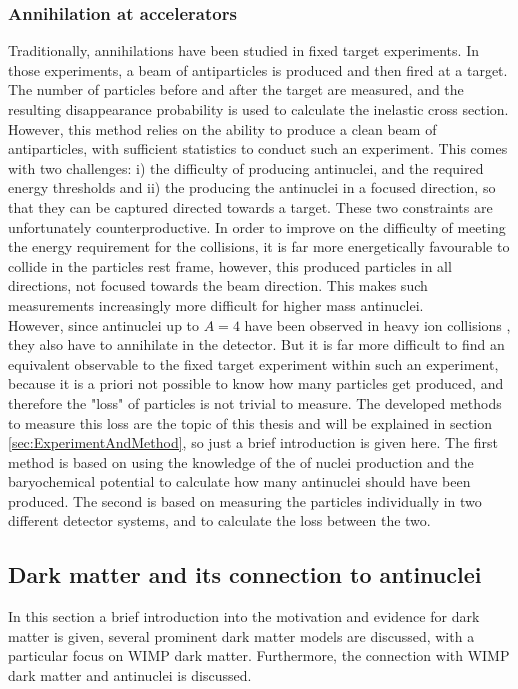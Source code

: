\subsubsection{Annihilation at accelerators}
Traditionally, annihilations have been studied in fixed target experiments. In those experiments, a beam of antiparticles is produced and then fired at a target. The number of particles before and after the target are measured, and the resulting disappearance probability is used to calculate the inelastic cross section. However, this method relies on the ability to produce a clean beam of antiparticles, with sufficient statistics to conduct such an experiment. This comes with two challenges: i) the difficulty of producing antinuclei, and the required energy thresholds and ii) the producing the antinuclei in a focused direction, so that they can be captured directed towards a target. These two constraints are unfortunately counterproductive. In order to improve on the difficulty of meeting the energy requirement for the collisions, it is far more energetically favourable to collide in the particles rest frame, however, this produced particles in all directions, not focused towards the beam direction. This makes such measurements increasingly more difficult for higher mass antinuclei.\\

However, since antinuclei up to $A=4$ have been observed in heavy ion collisions \cite{4He_PbPb}, they also have to annihilate in the detector. But it is far more difficult to find an equivalent observable to the fixed target experiment within such an experiment, because it is a priori not possible to know how many particles get produced, and therefore the "loss" of particles is not trivial to measure. The developed methods to measure this loss are the topic of this thesis and will be explained in section \ref{sec:ExperimentAndMethod}, so just a brief introduction is given here. The first method is based on using the knowledge of the of nuclei production and the baryochemical potential to calculate how many antinuclei should have been produced. The second is based on measuring the particles individually in two different detector systems, and to calculate the loss between the two. 

\subsection{Dark matter and its connection to antinuclei}
In this section a brief introduction into the motivation and evidence for dark matter is given, several prominent dark matter models are discussed, with a particular focus on WIMP dark matter. Furthermore, the connection with WIMP dark matter and antinuclei is discussed. 
